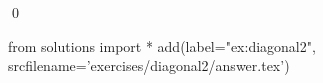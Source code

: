 
\begin{ex} 
  \label{ex:diagonal2}
  
  \qed
\end{ex} 
\begin{python0}
from solutions import *
add(label="ex:diagonal2",
    srcfilename='exercises/diagonal2/answer.tex') 
\end{python0}
